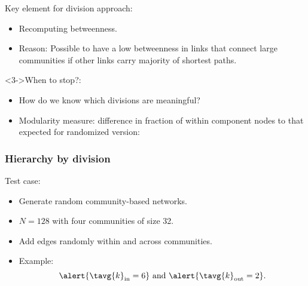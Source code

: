 \begin{frame}

  \begin{block}{Key element for division approach:}
    \begin{itemize}
    \item<1-> 
      Recomputing betweenness.
    \item<2-> 
      \alert{Reason:} Possible to have a low betweenness
      in links that connect large communities
      if other links carry majority of shortest paths.
    \end{itemize}
  \end{block}

  \begin{block}<3->{When to stop?:}
    \begin{itemize}
    \item<4-> 
      How do we know which
      divisions are meaningful?
    \item<5-> 
      \alert{Modularity measure:}
      difference in fraction of within component
      nodes to that expected for randomized version:\\
      \smallskip
    \end{itemize}
  \end{block}

\end{frame}



\begin{frame}
  \frametitle{Hierarchy by division}

  \begin{block}{Test case:}
    \begin{itemize}
    \item<1->
      Generate random community-based networks.
    \item<2->
      $N=128$ with four communities of size 32.
    \item<3->
      Add edges randomly within and across communities.
    \item<4->
      Example:
      $$ 
      \alert{ \tavg{k}_{\textnormal{in}} = 6}
      \
      \mbox{and}
      \
      \alert{ \tavg{k}_{\textnormal{out}} = 2}.
      $$
    \end{itemize}
  \end{block}

\end{frame}


